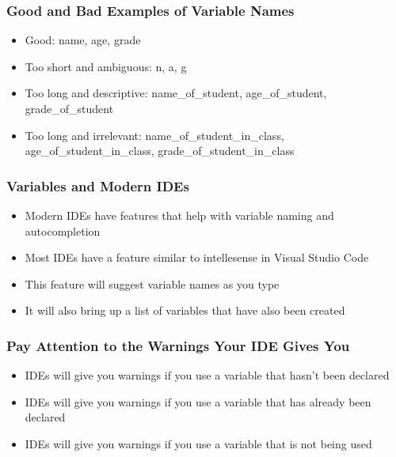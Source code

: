 \documentclass[serif, 9pt, aspectratio=32]{beamer}
\begin{document}
\begin{frame}
    \centering
    \frametitle{Good and Bad Examples of Variable Names}
    \begin{itemize}
        \setlength{\itemsep}{3em}
        \item Good: name, age, grade
        \item Too short and ambiguous: n, a, g
        \item Too long and descriptive: name\_of\_student, age\_of\_student, grade\_of\_student
        \item Too long and irrelevant: name\_of\_student\_in\_class, age\_of\_student\_in\_class, grade\_of\_student\_in\_class
    \end{itemize}
\end{frame}

\begin{frame}
    \centering
    \frametitle{Variables and Modern IDEs}
    \begin{itemize}
        \setlength{\itemsep}{3em}
        \item Modern IDEs have features that help with variable naming and autocompletion
        \item Most IDEs have a feature similar to intellesense in Visual Studio Code
        \item This feature will suggest variable names as you type
        \item It will also bring up a list of variables that have also been created
    \end{itemize}
\end{frame}

\begin{frame}
    \centering
    \frametitle{Pay Attention to the Warnings Your IDE Gives You}
    \begin{itemize}
        \setlength{\itemsep}{3em}
        \item IDEs will give you warnings if you use a variable that hasn't been declared
        \item IDEs will give you warnings if you use a variable that has already been declared
        \item IDEs will give you warnings if you use a variable that is not being used
    \end{itemize}
\end{frame}
\end{document}
